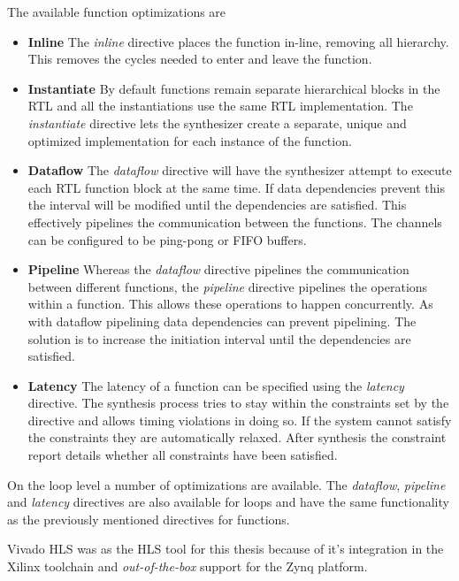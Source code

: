The available function optimizations are

\begin{itemize}
	\item 	\textbf{Inline} The \emph{inline} directive places the function in-line, removing all hierarchy. This removes the cycles needed to enter and leave the function.
	\item 	\textbf{Instantiate}  By default functions remain separate hierarchical blocks in the RTL and all the instantiations use the same RTL implementation. The \emph{instantiate} directive lets the synthesizer create a separate,
	unique and optimized implementation for each instance of the function. 
	\item 	\textbf{Dataflow} The \emph{dataflow} directive will have the synthesizer attempt to execute each RTL function block at the same time. If data dependencies prevent this the interval will be modified until the dependencies are satisfied. This effectively pipelines the communication between the functions. The channels can be configured to be ping-pong or FIFO buffers. 
	\item 	\textbf{Pipeline} Whereas the \emph{dataflow} directive pipelines the communication between different functions, the \emph{pipeline} directive pipelines the operations within a function. This allows these operations to happen concurrently. As with dataflow pipelining data dependencies can prevent pipelining. The solution is to increase the initiation interval until the dependencies are satisfied.
	\item 	\textbf{Latency} The latency of a function can be specified using the \emph{latency} directive. The synthesis process tries to stay within the constraints set by the directive and allows timing violations in doing so. If the system cannot satisfy the constraints they are automatically relaxed. After synthesis the constraint report details whether all constraints have been satisfied.
\end{itemize}

On the loop level a number of optimizations are available. The \emph{dataflow}, \emph{pipeline} and \emph{latency} directives are also available for loops and have the same functionality as the previously mentioned directives for functions.

Vivado HLS was as the HLS tool for this thesis because of it's integration in the Xilinx toolchain and \emph{out-of-the-box} support for the Zynq platform. 

